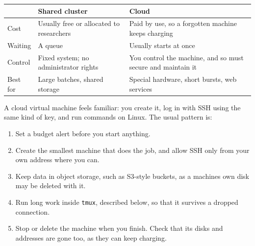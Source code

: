 {\def\LTcaptype{none} %
\begin{longtable}[]{@{}
  >{\raggedright\arraybackslash}p{}
  >{\raggedright\arraybackslash}p{}
  >{\raggedright\arraybackslash}p{}@{}}
\toprule\noalign{}
\begin{minipage}[b]{\linewidth}\raggedright
\end{minipage} & \begin{minipage}[b]{\linewidth}\raggedright
Shared cluster
\end{minipage} & \begin{minipage}[b]{\linewidth}\raggedright
Cloud
\end{minipage} \\
\midrule\noalign{}
\endhead
\bottomrule\noalign{}
\endlastfoot
Cost & Usually free or allocated to researchers & Paid by use, so a forgotten machine keeps charging \\
Waiting & A queue & Usually starts at once \\
Control & Fixed system; no administrator rights & You control the machine, and so must secure and maintain it \\
Best for & Large batches, shared storage & Special hardware, short bursts, web services \\
\end{longtable}
}

A cloud virtual machine feels familiar: you create it, log in with SSH using the same kind of key, and run commands on Linux. The usual pattern is:

\begin{enumerate}
\def\labelenumi{\arabic{enumi}.}
\tightlist
\item
  Set a budget alert before you start anything.
\item
  Create the smallest machine that does the job, and allow SSH only from your own address where you can.
\item
  Keep data in object storage, such as S3-style buckets, as a machine\textquotesingle s own disk may be deleted with it.
\item
  Run long work inside \texttt{tmux}, described below, so that it survives a dropped connection.
\item
  Stop or delete the machine when you finish. Check that its disks and addresses are gone too, as they can keep charging.
\end{enumerate}

